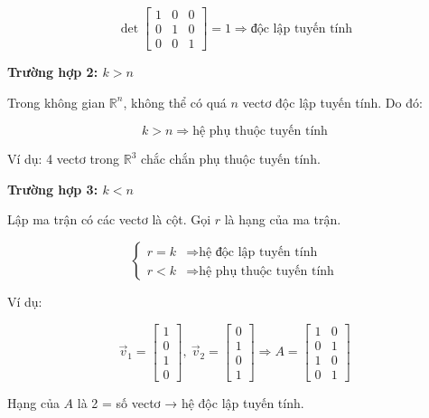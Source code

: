 \documentclass[12pt]{article}
\begin{document}
\[
\det\begin{bmatrix} 1 & 0 & 0 \\ 0 & 1 & 0 \\ 0 & 0 & 1 \end{bmatrix} = 1 \Rightarrow \text{độc lập tuyến tính}
\]

\textbf{Trường hợp 2: \( k > n \)}

Trong không gian \( \mathbb{R}^n \), không thể có quá \( n \) vectơ độc lập tuyến tính. Do đó:

\[
k > n \Rightarrow \text{hệ phụ thuộc tuyến tính}
\]

Ví dụ: 4 vectơ trong \( \mathbb{R}^3 \) chắc chắn phụ thuộc tuyến tính.

\textbf{Trường hợp 3: \( k < n \)}

Lập ma trận có các vectơ là cột. Gọi \( r \) là hạng của ma trận.

\[
\begin{cases}
r = k & \Rightarrow \text{hệ độc lập tuyến tính} \\
r < k & \Rightarrow \text{hệ phụ thuộc tuyến tính}
\end{cases}
\]

Ví dụ:

\[
\vec{v}_1 = \begin{bmatrix} 1 \\ 0 \\ 1 \\ 0 \end{bmatrix},\ 
\vec{v}_2 = \begin{bmatrix} 0 \\ 1 \\ 0 \\ 1 \end{bmatrix}
\Rightarrow 
A = \begin{bmatrix} 1 & 0 \\ 0 & 1 \\ 1 & 0 \\ 0 & 1 \end{bmatrix}
\]

Hạng của \( A \) là 2 = số vectơ → hệ độc lập tuyến tính.
\end{document}
